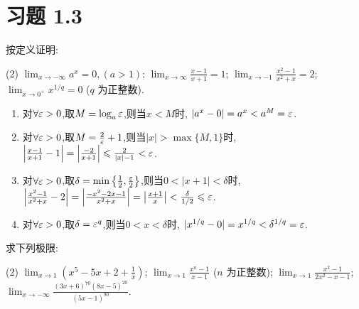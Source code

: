 \section{习题 1.3}

\begin{exercise}[1.3.1]\label{exe:1.3.1}
    按定义证明:
    \begin{tasks}[label=(\arabic*)](2)
        \task $\lim_{x \to -\infty} a^x = 0, (a > 1)$;
        \task $\lim_{x \to \infty} \frac{x-1}{x+1} = 1$;
        \task $\lim_{x \to -1} \frac{x^2-1}{x^2+x} = 2$;
        \task $\lim_{x \to 0^+} x^{1/q} = 0$ ($q$ 为正整数).
    \end{tasks}
\end{exercise}

\begin{solution}
    \begin{enumerate}[(1)]
        \item 对$\forall \varepsilon > 0$,取$M = \log_a \varepsilon$,则当$x < M$时, $|a^x - 0| = a^x < a^M = \varepsilon$.
        \item 对$\forall \varepsilon > 0$,取$M = \frac{2}{\varepsilon}+1$,则当$|x| > \max\{M,1\}$时, $\left| \frac{x-1}{x+1} - 1 \right| = \left| \frac{-2}{x+1} \right| \leqslant \frac{2}{|x|-1} <  \varepsilon$.
        \item 对$\forall \varepsilon > 0$,取$\delta = \min \left\{ \frac{1}{2}, \frac{\varepsilon}{2} \right\}$,则当$0<|x+1| < \delta$时, $\left| \frac{x^2-1}{x^2+x} - 2 \right| = \left| \frac{-x^2 - 2x - 1}{x^2 + x} \right| = \left| \frac{x+1}{x} \right| < \frac{\delta}{1 / 2} \leqslant  \varepsilon$.
        \item 对$\forall \varepsilon > 0$,取$\delta = \varepsilon^q$,则当$0 < x < \delta$时, $|x^{1/q} - 0| = x^{1/q} < \delta^{1/q} = \varepsilon$.
    \end{enumerate}
\end{solution}

\begin{exercise}[1.3.2]
    求下列极限:
    \begin{tasks}[label=(\arabic*)](2)
        \task $\lim_{x \to 1} \left(x^5 - 5x + 2 + \frac{1}{x}\right)$;
        \task $\lim_{x \to 1} \frac{x^n - 1}{x - 1}$ ($n$ 为正整数);
        \task $\lim_{x \to 1} \frac{x^2-1}{2x^2-x-1}$;
        \task $\lim_{x \to -\infty} \frac{(3x+6)^{70}(8x-5)^{20}}{(5x-1)^{90}}$.
    \end{tasks}
\end{exercise}

